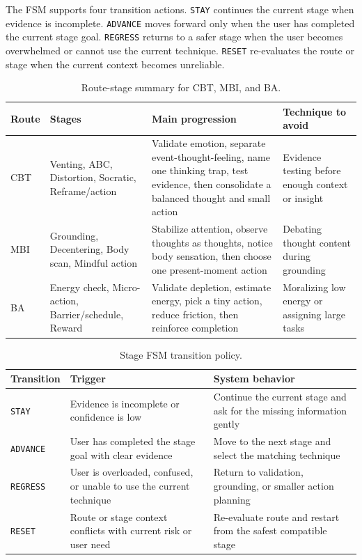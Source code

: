 The FSM supports four transition actions. \texttt{STAY} continues the current stage when evidence is incomplete. \texttt{ADVANCE} moves forward only when the user has completed the current stage goal. \texttt{REGRESS} returns to a safer stage when the user becomes overwhelmed or cannot use the current technique. \texttt{RESET} re-evaluates the route or stage when the current context becomes unreliable.

\begin{table}[tb]
\centering
\caption{Route-stage summary for CBT, MBI, and BA.}
\label{tab:stage_contracts}
\scriptsize
\setlength{\tabcolsep}{3pt}
\begin{tabular}{@{}p{}p{}p{}p{}@{}}
\toprule
Route & Stages & Main progression & Technique to avoid \\
\midrule
CBT & Venting, ABC, Distortion, Socratic, Reframe/action & Validate emotion, separate event-thought-feeling, name one thinking trap, test evidence, then consolidate a balanced thought and small action & Evidence testing before enough context or insight \\
MBI & Grounding, Decentering, Body scan, Mindful action & Stabilize attention, observe thoughts as thoughts, notice body sensation, then choose one present-moment action & Debating thought content during grounding \\
BA & Energy check, Micro-action, Barrier/schedule, Reward & Validate depletion, estimate energy, pick a tiny action, reduce friction, then reinforce completion & Moralizing low energy or assigning large tasks \\
\bottomrule
\end{tabular}
\end{table}

\begin{table}[tb]
\centering
\caption{Stage FSM transition policy.}
\label{tab:fsm_policy}
\small
\begin{tabular}{p{}p{}p{}}
\toprule
Transition & Trigger & System behavior \\
\midrule
\texttt{STAY} & Evidence is incomplete or confidence is low & Continue the current stage and ask for the missing information gently \\
\texttt{ADVANCE} & User has completed the stage goal with clear evidence & Move to the next stage and select the matching technique \\
\texttt{REGRESS} & User is overloaded, confused, or unable to use the current technique & Return to validation, grounding, or smaller action planning \\
\texttt{RESET} & Route or stage context conflicts with current risk or user need & Re-evaluate route and restart from the safest compatible stage \\
\bottomrule
\end{tabular}
\end{table}

